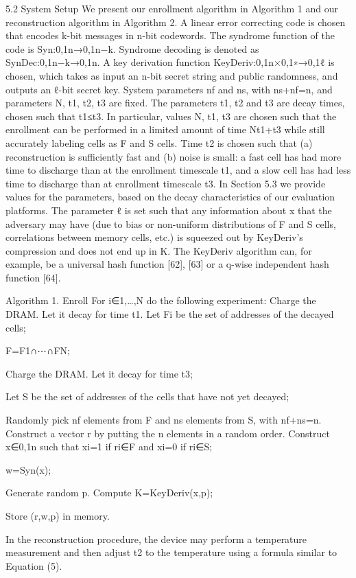 \documentclass[journal, a4paper]{IEEEtran}
\begin{document}
5.2 System Setup
We present our enrollment algorithm in Algorithm 1 and our reconstruction algorithm in Algorithm 2. A linear error correcting code is chosen that encodes k-bit messages in n-bit codewords. The syndrome function of the code is Syn:{0,1}n→{0,1}n−k. Syndrome decoding is denoted as SynDec:{0,1}n−k→{0,1}n. A key derivation function KeyDeriv:{0,1}n×{0,1}∗→{0,1}ℓ is chosen, which takes as input an n-bit secret string and public randomness, and outputs an ℓ-bit secret key. System parameters nf and ns, with ns+nf=n, and parameters N, t1, t2, t3 are fixed. The parameters t1, t2 and t3 are decay times, chosen such that t1≤t3. In particular, values N, t1, t3 are chosen such that the enrollment can be performed in a limited amount of time Nt1+t3 while still accurately labeling cells as F and S cells. Time t2 is chosen such that (a) reconstruction is sufficiently fast and (b) noise is small: a fast cell has had more time to discharge than at the enrollment timescale t1, and a slow cell has had less time to discharge than at enrollment timescale t3. In Section 5.3 we provide values for the parameters, based on the decay characteristics of our evaluation platforms. The parameter ℓ is set such that any information about x that the adversary may have (due to bias or non-uniform distributions of F and S cells, correlations between memory cells, etc.) is squeezed out by KeyDeriv's compression and does not end up in K. The KeyDeriv algorithm can, for example, be a universal hash function [62], [63] or a q-wise independent hash function [64].

Algorithm 1. Enroll
For i∈{1,…,N} do the following experiment: Charge the DRAM. Let it decay for time t1. Let Fi be the set of addresses of the decayed cells;

F=F1∩⋯∩FN;

Charge the DRAM. Let it decay for time t3;

Let S be the set of addresses of the cells that have not yet decayed;

Randomly pick nf elements from F and ns elements from S, with nf+ns=n. Construct a vector r by putting the n elements in a random order. Construct x∈{0,1}n such that xi=1 if ri∈F and xi=0 if ri∈S;

w=Syn(x);

Generate random p. Compute K=KeyDeriv(x,p);

Store (r,w,p) in memory.

In the reconstruction procedure, the device may perform a temperature measurement and then adjust t2 to the temperature using a formula similar to Equation (5).
\end{document}
